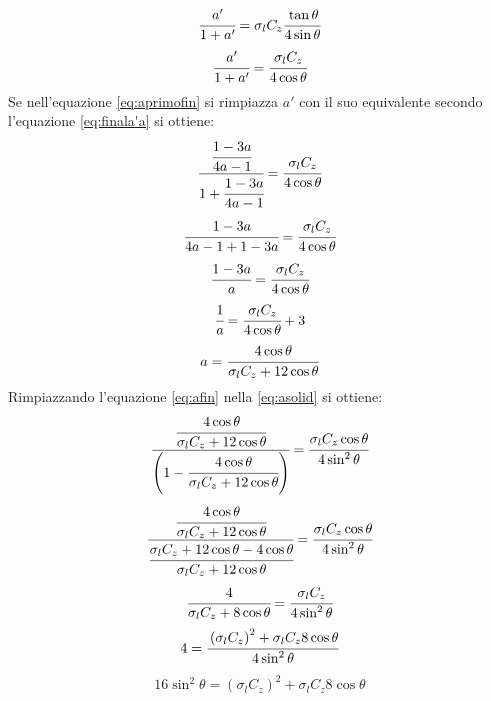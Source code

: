 \begin{align*}
\cfrac{a'}{1+a'} = \sigma_l C_z \cfrac{\tan \theta}{4 \sin \theta}
\end{align*}
\begin{equation}\label{eq:aprimofin}
\cfrac{a'}{1+a'} = \cfrac{\sigma_l C_z}{4 \cos \theta}
\end{equation}
Se nell'equazione \ref{eq:aprimofin} si rimpiazza $a'$ con il suo equivalente secondo l'equazione \ref{eq:finala'a} si ottiene:
\begin{align*}
\cfrac{\cfrac{1-3a}{4a-1}}{1+\cfrac{1-3a}{4a-1}} = \cfrac{\sigma_l C_z}{4 \cos \theta}
\end{align*}
\begin{align*}
\cfrac{1-3a}{4a-1+1-3a} = \cfrac{\sigma_l C_z}{4 \cos \theta}
\end{align*}
\begin{align*}
\cfrac{1-3a}{a} = \cfrac{\sigma_l C_z }{4 \cos \theta}
\end{align*}
\begin{align*}
\cfrac{1}{a} = \cfrac{\sigma_l C_z}{4 \cos \theta} + 3
\end{align*}
\begin{equation}\label{eq:afin}
a = \cfrac{4 \cos \theta}{\sigma_l C_z +12 \cos \theta}
\end{equation}
Rimpiazzando l'equazione \ref{eq:afin} nella \ref{eq:asolid} si ottiene:
\begin{align*}
\cfrac{\cfrac{4 \cos \theta}{\sigma_l C_z + 12 \cos \theta}}{\left( 1- \cfrac{4 \cos \theta}{\sigma_l C_z + 12 \cos \theta} \right)} = \cfrac{\sigma_l C_z \cos \theta}{4 \sin^2 \theta}
\end{align*}
\begin{align*}
\cfrac{\cfrac{4 \cos \theta}{\sigma_l C_z + 12 \cos \theta}}{\cfrac{\sigma_l C_z + 12 \cos \theta - 4 \cos \theta}{\sigma_l C_z + 12 \cos \theta}} = \cfrac{\sigma_l C_z \cos\theta}{4 \sin^2 \theta}
\end{align*}
\begin{align*}
\cfrac{4}{\sigma_l C_z + 8 \cos \theta} = \cfrac{\sigma_l C_z}{4 \sin^2 \theta}
\end{align*}
\begin{align*}
4 = \cfrac{\left( \sigma_l C_z \right)^2 + \sigma_l C_z 8 \cos \theta}{4 \sin^2 \theta}
\end{align*}
\begin{align*}
16 \sin^2 \theta = \left( \sigma_l C_z \right)^2 + \sigma_l C_z 8 \cos \theta
\end{align*}
